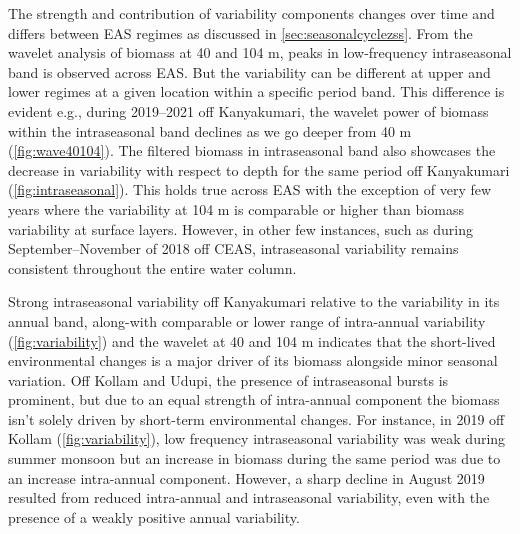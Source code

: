 \documentclass{article}
\begin{document}
	The strength and contribution of variability components changes over time  and differs between EAS regimes as discussed in \cref{sec:seasonalcyclezss}. From the wavelet analysis of biomass at 40 and 104 m, peaks in low-frequency intraseasonal band is observed across EAS. But the variability can be different at upper and lower regimes at a given location within a specific period band. This difference is evident e.g., during 2019--2021 off Kanyakumari, the wavelet power of biomass within the intraseasonal band declines as we go deeper from 40 m (\cref{fig:wave40104}). The filtered biomass in intraseasonal band also showcases the decrease in variability with respect to depth for the same period off Kanyakumari (\cref{fig:intraseasonal}). This holds true across EAS with the exception of very few years where the variability at 104 m is comparable or higher than biomass variability at surface layers. However, in other few instances, such as during September--November of 2018 off CEAS, intraseasonal variability remains consistent throughout the entire water column. 
	
	Strong intraseasonal variability off Kanyakumari relative to the variability in its annual band, along-with comparable or lower range of intra-annual variability (\cref{fig:variability}) and the wavelet at 40 and 104 m indicates that the short-lived environmental changes is a major driver of its biomass alongside minor seasonal variation. Off Kollam and Udupi, the presence of intraseasonal bursts is prominent, but due to an equal strength of intra-annual component the biomass isn't solely driven by short-term environmental changes. For instance, in 2019 off Kollam (\cref{fig:variability}), low frequency intraseasonal variability was weak during summer monsoon but an increase in biomass during the same period was due to an increase intra-annual component. However, a sharp decline in August 2019 resulted from reduced intra-annual and intraseasonal variability, even with the presence of a weakly positive annual variability. 
	
\end{document}
